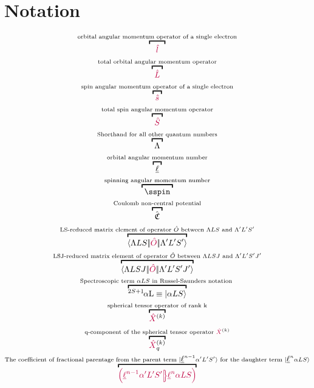 \documentclass[11pt, twoside,openright]{article}
\begin{document}


\section{Notation}\label{section:notation}

\begin{gather}
    \overbracket{\,\,\,\,\,\op{l}\,\,\,\,\,}^{\text{orbital angular momentum operator of a single electron}} \\
    \overbracket{\,\,\op{L}\,\,}^{\text{total orbital angular momentum  operator}} \\
    \overbracket{\,\,\op{s}\,\,}^{\text{spin angular momentum  operator of a single electron}} \\
    \overbracket{\,\,\op{S}\,\,}^{\text{total spin angular momentum operator}} \\
    \overbracket{\,\,\Lambda\,\,}^{\text{Shorthand for all other quantum numbers}} \\ 
    \overbracket{\,\,\lorb\,\,}^{\text{orbital angular momentum number}} \\
    \overbracket{\,\,\sspin\,\,}^{\text{spinning angular momentum number}} \\
    \overbracket{\,\,\CoulombNonCentral\,\,}^{\text{Coulomb non-central potential}} \\
    \overbracket{\redbraopket{\Lambda LS}{\op{O}}{\Lambda' L'S'}}^{\text{LS-reduced matrix element of operator }\hat{O}\text{ between }{\Lambda LS} \text{ and } {\Lambda' L'S'}} \\
    \overbracket{\redbraopket{\Lambda LSJ}{\op{O}}{\Lambda' L'S'J'}}^{\text{LSJ-reduced matrix element of operator }\hat{O}\text{ between }{\Lambda LSJ} \text{ and } {\Lambda' L'S'J'}} \\
    \overbracket{\LSterm{2 S + 1}{$\alpha$L}\equiv \ket{\alpha{LS}}}^{\text{Spectroscopic term } {\alpha{LS}} \text{ in Russel-Saunders notation }} \\
    \overbracket{\op{X}^{(k)}}^{\text{spherical tensor operator of rank k}} \\
    \overbracket{\op{X}_q^{(k)}}^{\text{q-component of the spherical tensor operator }\op{X}^{(k)}} \\
    \overbracket{\cfp{\lorb^{n-1}\alpha'L'S'}{\lorb^n\alpha{L}{S}}}^{\text{The coefficient of fractional parentage from the parent term }\ket{\lorb^{n-1}\alpha'{L'S'}}\text{ for the daughter term }\ket{\lorb^{n}\alpha{LS}}}  
\end{gather}
\end{document}

